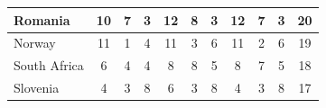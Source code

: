 \documentclass[12pt]{article}  %
\begin{document}
\begin{subappendices}
\begin{longtable}{|l|c|c|c|c|c|c|c|c|c|c|}
	\hline
	Romania                                                        & 10                                                                     & 7                                                                      & 3                                                                      & 12                                                                     & 8                                                                      & 3                                                                      & 12                        & 7                           & 3                           & 20                          \\ 
	\hline
	Norway                                                         & 11                                                                     & 1                                                                      & 4                                                                      & 11                                                                     & 3                                                                      & 6                                                                      & 11                        & 2                           & 6                           & 19                          \\ 
	\hline
	South Africa                                                   & 6                                                                      & 4                                                                      & 4                                                                      & 8                                                                      & 8                                                                      & 5                                                                      & 8                         & 7                           & 5                           & 18                          \\ 
	\hline
	Slovenia                                                       & 4                                                                      & 3                                                                      & 8                                                                      & 6                                                                      & 3                                                                      & 8                                                                      & 4                         & 3                           & 8                           & 17                          \\ 

\end{longtable}
\end{subappendices}
\end{document}
